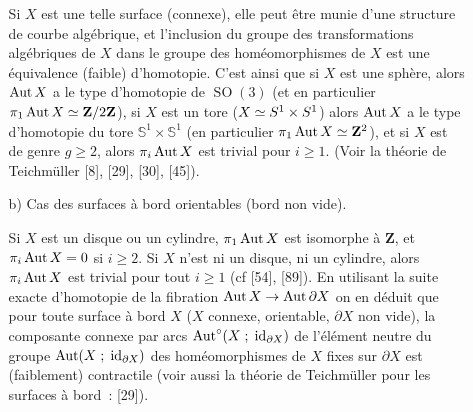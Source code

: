 \begin{itemize}
\begin{itemize}
        Si $X$ est une telle surface (connexe), elle peut être munie d'une structure de courbe algébrique, et l'inclusion du groupe des transformations algébriques de $X$ dans le groupe des homéomorphismes de $X$ est une équivalence (faible) d'homotopie. C'est ainsi que si $X$ est une sphère, alors $\Aut X$ a le type d'homotopie de $\operatorname{SO}(3)$ (et en particulier $\pi_1 \Aut X \isom \mathbf{Z}/2\mathbf{Z}$), si $X$ est un tore ($X \isom S^1 \times S^1$) alors $\Aut X$ a le type d'homotopie du tore $\mathbb{S}^1 \times \mathbb{S}^1$ (en particulier $\pi_1 \Aut X \isom \mathbf{Z}^2$), et si $X$ est de genre $g \ge 2$, alors $\pi_i \Aut X$ est trivial pour $i \ge 1$. (Voir la théorie de Teichmüller [8], [29], [30], [45]).
        \item[b)] Cas des surfaces à bord orientables (bord non vide).

        Si $X$ est un disque ou un cylindre, $\pi_1 \operatorname{Aut} X$ est isomorphe à $\mathbf{Z}$, et $\pi_i \operatorname{Aut} X = 0$ si $i \ge 2$. Si $X$ n'est ni un disque, ni un cylindre, alors $\pi_i \Aut X$ est trivial pour tout $i \ge 1$ (cf [54], [89]). En utilisant la suite exacte d'homotopie de la fibration $\operatorname{Aut} X \to \operatorname{Aut} \partial X$ on en déduit que pour toute surface à bord $X$ ($X$ connexe, orientable, $\partial X$ non vide), la composante connexe par arcs $\operatorname{Aut}^\circ(X \;;\; \operatorname{id}_{\partial X})$ de l'élément neutre du groupe $\operatorname{Aut} (X \;;\; \operatorname{id}_{\partial X})$ des homéomorphismes de $X$ fixes sur $\partial X$ est (faiblement) contractile (voir aussi la théorie de Teichmüller pour les surfaces à bord~: [29]).
    \end{itemize}
\end{itemize}

 
